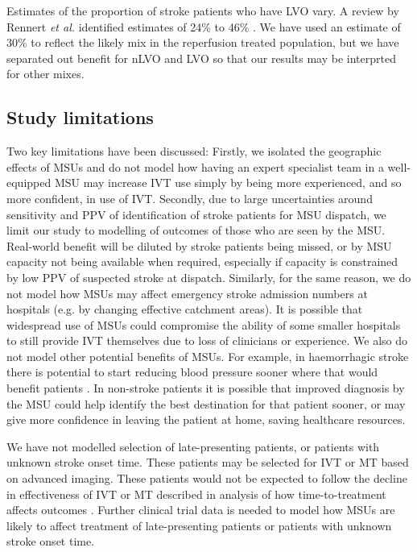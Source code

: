 Estimates of the proportion of stroke patients who have LVO vary. A review by Rennert \textit{et al.} identified estimates of 24\% to 46\% \cite{rennert_epidemiology_2019}. We have used an estimate of 30\% to reflect the likely mix in the reperfusion treated population, but we have separated out benefit for nLVO and LVO so that our results may be interprted for other mixes.

\subsection{Study limitations}

Two key limitations have been discussed: Firstly, we isolated the geographic effects of MSUs and do not model how having an expert specialist team in a well-equipped MSU may increase IVT use simply by being more experienced, and so more confident, in use of IVT. Secondly, due to large uncertainties around sensitivity and PPV of identification of stroke patients for MSU dispatch, we limit our study to modelling of outcomes of those who are seen by the MSU. Real-world benefit will be diluted by stroke patients being missed, or by MSU capacity not being available when required, especially if capacity is constrained by low PPV of suspected stroke at dispatch. Similarly, for the same reason, we do not model how MSUs may affect emergency stroke admission numbers at hospitals (e.g. by changing effective catchment areas). It is possible that widespread use of MSUs could compromise the ability of some smaller hospitals to still provide IVT themselves due to loss of clinicians or experience. We also do not model other potential benefits of MSUs. For example, in haemorrhagic stroke there is potential to start reducing blood pressure sooner where that would benefit patients \cite{li_intensive_2024}. In non-stroke patients it is possible that improved diagnosis by the MSU could help identify the best destination for that patient sooner, or may give more confidence in leaving the patient at home, saving healthcare resources.

We have not modelled selection of late-presenting patients, or patients with unknown stroke onset time. These patients may be selected for IVT or MT based on advanced imaging. These patients would not be expected to follow the decline in effectiveness of IVT or MT described in analysis of how time-to-treatment affects outcomes \cite{emberson_effect_2014, fransen_time_2016}. Further clinical trial data is needed to model how MSUs are likely to affect treatment of late-presenting patients or patients with unknown stroke onset time.

